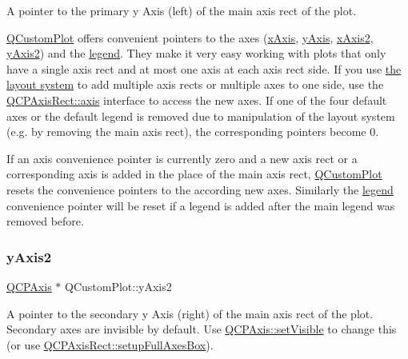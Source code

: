 A pointer to the primary y Axis (left) of the main axis rect of the plot.

\hyperlink{class_q_custom_plot}{Q\+Custom\+Plot} offers convenient pointers to the axes (\hyperlink{class_q_custom_plot_a9a79cd0158a4c7f30cbc702f0fd800e4}{x\+Axis}, \hyperlink{class_q_custom_plot_af6fea5679725b152c14facd920b19367}{y\+Axis}, \hyperlink{class_q_custom_plot_ada41599f22cad901c030f3dcbdd82fd9}{x\+Axis2}, \hyperlink{class_q_custom_plot_af13fdc5bce7d0fabd640f13ba805c0b7}{y\+Axis2}) and the \hyperlink{class_q_custom_plot_a4eadcd237dc6a09938b68b16877fa6af}{legend}. They make it very easy working with plots that only have a single axis rect and at most one axis at each axis rect side. If you use \hyperlink{}{the layout system} to add multiple axis rects or multiple axes to one side, use the \hyperlink{class_q_c_p_axis_rect_a583ae4f6d78b601b732183f6cabecbe1}{Q\+C\+P\+Axis\+Rect\+::axis} interface to access the new axes. If one of the four default axes or the default legend is removed due to manipulation of the layout system (e.\+g. by removing the main axis rect), the corresponding pointers become 0.

If an axis convenience pointer is currently zero and a new axis rect or a corresponding axis is added in the place of the main axis rect, \hyperlink{class_q_custom_plot}{Q\+Custom\+Plot} resets the convenience pointers to the according new axes. Similarly the \hyperlink{class_q_custom_plot_a4eadcd237dc6a09938b68b16877fa6af}{legend} convenience pointer will be reset if a legend is added after the main legend was removed before. \mbox{\label{class_q_custom_plot_af13fdc5bce7d0fabd640f13ba805c0b7}} 
\subsubsection{\texorpdfstring{y\+Axis2}{yAxis2}}
{\footnotesize\ttfamily \hyperlink{class_q_c_p_axis}{Q\+C\+P\+Axis} $\ast$ Q\+Custom\+Plot\+::y\+Axis2}

A pointer to the secondary y Axis (right) of the main axis rect of the plot. Secondary axes are invisible by default. Use \hyperlink{class_q_c_p_layerable_a3bed99ddc396b48ce3ebfdc0418744f8}{Q\+C\+P\+Axis\+::set\+Visible} to change this (or use \hyperlink{class_q_c_p_axis_rect_a5fa906175447b14206954f77fc7f1ef4}{Q\+C\+P\+Axis\+Rect\+::setup\+Full\+Axes\+Box}).

